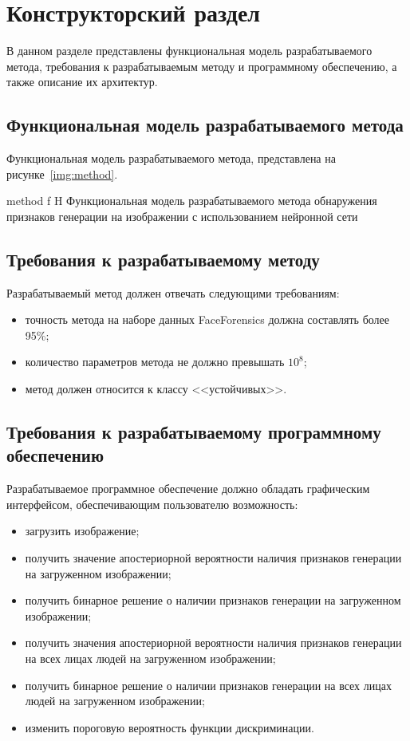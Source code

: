 \chapter{Конструкторский раздел}

В данном разделе представлены функциональная модель разрабатываемого метода, требования к разрабатываемым методу и программному обеспечению, а также описание их архитектур.

\section{Функциональная модель разрабатываемого метода}

Функциональная модель разрабатываемого метода, представлена на рисунке~\ref{img:method}.

{method}
{f} %
{H}
{\textwidth} %
{Функциональная модель разрабатываемого метода обнаружения признаков генерации на изображении с использованием нейронной сети}

\section{Требования к разрабатываемому методу}
\label{sec:method-requirements}

Разрабатываемый метод должен отвечать следующими требованиям:
\begin{itemize}
	\item точность метода на наборе данных FaceForensics должна составлять более 95\%;
	\item количество параметров метода не должно превышать $10^8$;
	\item метод должен относится к классу <<устойчивых>>.
\end{itemize}

\section{Требования к разрабатываемому программному обеспечению}
\label{sec:software-requirements}

Разрабатываемое программное обеспечение должно обладать графическим интерфейсом, обеспечивающим пользователю возможность:
\begin{itemize}
	\item загрузить изображение;
	\item получить значение апостериорной вероятности наличия признаков генерации на загруженном изображении;
	\item получить бинарное решение о наличии признаков генерации на загруженном изображении;
	\item получить значения апостериорной вероятности наличия признаков генерации на всех лицах людей на загруженном изображении;
	\item получить бинарное решение о наличии признаков генерации на всех лицах людей на загруженном изображении;
	\item изменить пороговую вероятность функции дискриминации.
\end{itemize}

